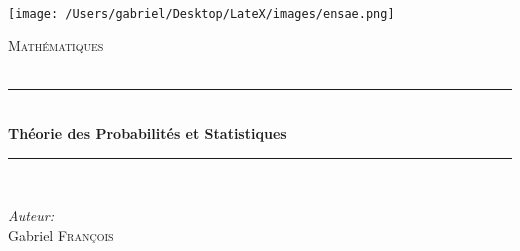 \documentclass[12pt]{article}
\newcommand{\1}{\bb{1}} %
\newcommand{\HRule}{\rule{\linewidth}{0.5mm}} %
\begin{document}
         

\onehalfspacing %

\begin{titlepage}

\center %
 

\textsc{\LARGE }\\[2cm] %
\vspace{-1em}

\texttt{[image: /Users/gabriel/Desktop/LateX/images/ensae.png]} 
 \vspace{6em}
 
\textsc{\Large Mathématiques}\\[0.5cm] %
\textsc{\large }\\[0.5cm] %


\HRule \\[0.7cm]
{ \huge \bfseries Théorie des Probabilités et Statistiques }\\[0.4cm] %
\HRule \\[1.5cm]
 

\begin{minipage}{0.4\textwidth}
\begin{flushleft} \large \vspace{5em}
\centering
\emph{Auteur:}\\
Gabriel \textsc{François}\\ %
\end{flushleft}

\end{minipage}\\[2cm]


\end{titlepage}
\end{document}
